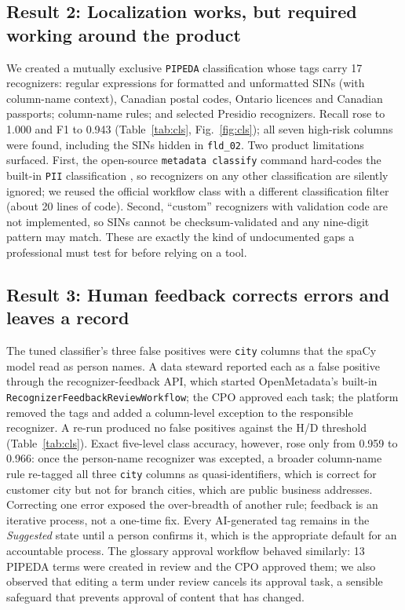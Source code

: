 \documentclass[journal,onecolumn,11pt]{IEEEtran}
\begin{document}
\subsection{Result 2: Localization works, but required working around the product}
We created a mutually exclusive \texttt{PIPEDA} classification whose tags carry 17 recognizers: regular expressions for formatted and unformatted SINs (with column-name context), Canadian postal codes, Ontario licences and Canadian passports; column-name rules; and selected Presidio recognizers. Recall rose to 1.000 and F1 to 0.943 (Table~\ref{tab:cls}, Fig.~\ref{fig:cls}); all seven high-risk columns were found, including the SINs hidden in \texttt{fld\_02}. Two product limitations surfaced. First, the open-source \texttt{metadata classify} command hard-codes the built-in \texttt{PII} classification \cite{om_source}, so recognizers on any other classification are silently ignored; we reused the official workflow class with a different classification filter (about 20 lines of code). Second, ``custom'' recognizers with validation code are not implemented, so SINs cannot be checksum-validated and any nine-digit pattern may match. These are exactly the kind of undocumented gaps a professional must test for before relying on a tool.

\subsection{Result 3: Human feedback corrects errors and leaves a record}
The tuned classifier's three false positives were \texttt{city} columns that the spaCy model read as person names. A data steward reported each as a false positive through the recognizer-feedback API, which started OpenMetadata's built-in \texttt{RecognizerFeedbackReviewWorkflow}; the CPO approved each task; the platform removed the tags and added a column-level exception to the responsible recognizer. A re-run produced no false positives against the H/D threshold (Table~\ref{tab:cls}). Exact five-level class accuracy, however, rose only from 0.959 to 0.966: once the person-name recognizer was excepted, a broader column-name rule re-tagged all three \texttt{city} columns as quasi-identifiers, which is correct for customer city but not for branch cities, which are public business addresses. Correcting one error exposed the over-breadth of another rule; feedback is an iterative process, not a one-time fix. Every AI-generated tag remains in the \emph{Suggested} state until a person confirms it, which is the appropriate default for an accountable process. The glossary approval workflow behaved similarly: 13 PIPEDA terms were created in review and the CPO approved them; we also observed that editing a term under review cancels its approval task, a sensible safeguard that prevents approval of content that has changed.
\end{document}
